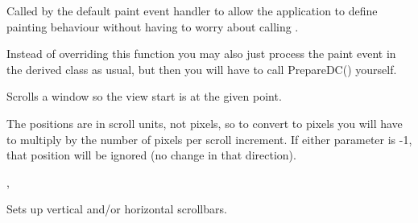 \label{wxscrolledwindowondraw}


Called by the default paint event handler to allow the application to define
painting behaviour without having to worry about calling
.

Instead of overriding this function you may also just process the paint event
in the derived class as usual, but then you will have to call PrepareDC()
yourself.

\label{wxscrolledwindowscroll}


Scrolls a window so the view start is at the given point.





The positions are in scroll units, not pixels, so to convert to pixels you
will have to multiply by the number of pixels per scroll increment.
If either parameter is -1, that position will be ignored (no change in
that direction).


,\rtfsp
{}

\label{wxscrolledwindowsetscrollbars}


Sets up vertical and/or horizontal scrollbars.




